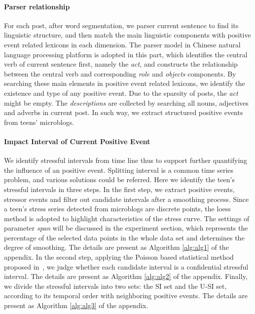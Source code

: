 \paragraph{Parser relationship}
For each post, after word segmentation, we parser current sentence to find its linguistic structure,
and then match the main linguistic components with positive event related lexicons in each dimension.
The parser model in Chinese natural language processing platform \cite{Che2010, che2008} is adopted in this part,
which identifies the central verb of current sentence first, namely the \emph{act},
and constructs the relationship between the central verb and corresponding \emph{role} and \emph{objects} components.
By searching these main elements in positive event related lexicons,
we identify the existence and type of any positive event.
Due to the sparsity of posts, the \emph{act} might be empty.
The \emph{descriptions} are collected by searching all nouns, adjectives and adverbs in current post.
In such way, we extract structured positive events from teens' microblogs.

\paragraph{Impact Interval of Current Positive Event}
We identify stressful intervals from time line thus to support further quantifying the influence of an positive event.
Splitting interval is a common time series problem, and various solutions could be referred.
Here we identify the teen's stressful intervals in three steps.
In the first step, we extract positive events, stressor events and filter out candidate intervals after a smoothing process.
Since a teen's stress series detected from microblogs are discrete points,
the loess method \cite{Cleveland1988Locally} is adopted to highlight characteristics of the stress curve.
The settings of parameter \emph{span} will be discussed in the experiment section,
which represents the percentage of the selected data points in the whole data set
and determines the degree of smoothing.
The details are present as Algorithm \ref{alg:alg1} of the appendix.
In the second step, applying the Poisson based statistical method proposed in~\cite{Li2017Analyzing},
we judge whether each candidate interval is a confidential stressful interval.
The details are present as Algorithm \ref{alg:alg2} of the appendix.
Finally, we divide the stressful intervals into two sets: the SI set and the U-SI set,
according to its temporal order with neighboring positive events.
The details are present as Algorithm \ref{alg:alg3} of the appendix.

